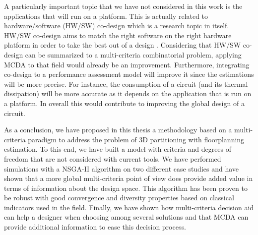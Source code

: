 A particularly important topic that we have not considered in this work is the applications that will run on a platform. This is actually related to hardware/software (HW/SW) co-design which is a research topic in itself. HW/SW co-design aims to match the right software on the right hardware platform in order to take the best out of a design \cite{abdallah2011}. Considering that HW/SW co-design can be summarized to a multi-criteria combinatorial problem, applying MCDA to that field would already be an improvement. Furthermore, integrating co-design to a performance assessment model will improve it since the estimations will be more precise. For instance, the consumption of a circuit (and its thermal dissipation) will be more accurate as it depends on the application that is run on a platform. In overall this would contribute to improving the global design of a circuit.

As a conclusion, we have proposed in this thesis a methodology based on a multi-criteria paradigm to address the problem of 3D partitioning with floorplanning estimation. To this end, we have built a model with criteria and degrees of freedom that are not considered with current tools. We have performed simulations with a NSGA-II algorithm on two different case studies and have shown that a more global multi-criteria point of view does provide added value in terms of information about the design space. This algorithm has been proven to be robust with good convergence and diversity properties based on classical indicators used in the field. Finally, we have shown how multi-criteria decision aid can help a designer when choosing among several solutions and that MCDA can provide additional information to ease this decision process. %